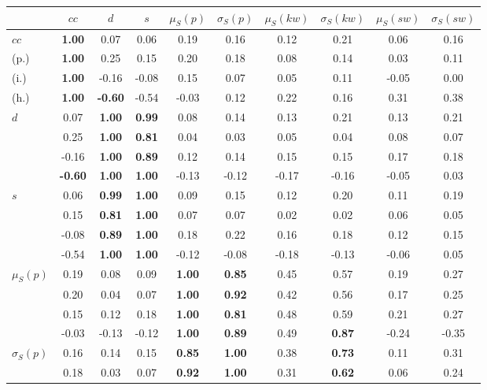 \begin{table*}[h!]
\begin{center}
\begin{tabular}{| l || c | c | c | c | c | c | c | c | c |}\hline
 & $cc$ & $d$ & $s$ & $\mu_S(p)$ & $\sigma_S(p)$ & $\mu_S(kw)$ & $\sigma_S(kw)$ & $\mu_S(sw)$ & $\sigma_S(sw)$ \\\hline\hline
$cc$ & {\bf 1.00} & 0.07 & 0.06 & 0.19 & 0.16 & 0.12 & 0.21 & 0.06 & 0.16 \\
(p.) & {\bf 1.00} & 0.25 & 0.15 & 0.20 & 0.18 & 0.08 & 0.14 & 0.03 & 0.11 \\
(i.) & {\bf 1.00} & -0.16 & -0.08 & 0.15 & 0.07 & 0.05 & 0.11 & -0.05 & 0.00 \\
(h.) & {\bf 1.00} & {\bf -0.60} & -0.54 & -0.03 & 0.12 & 0.22 & 0.16 & 0.31 & 0.38 \\\hline
$d$ & 0.07 & {\bf 1.00} & {\bf 0.99} & 0.08 & 0.14 & 0.13 & 0.21 & 0.13 & 0.21 \\
 & 0.25 & {\bf 1.00} & {\bf 0.81} & 0.04 & 0.03 & 0.05 & 0.04 & 0.08 & 0.07 \\
 & -0.16 & {\bf 1.00} & {\bf 0.89} & 0.12 & 0.14 & 0.15 & 0.15 & 0.17 & 0.18 \\
 & {\bf -0.60} & {\bf 1.00} & {\bf 1.00} & -0.13 & -0.12 & -0.17 & -0.16 & -0.05 & 0.03 \\\hline
$s$ & 0.06 & {\bf 0.99} & {\bf 1.00} & 0.09 & 0.15 & 0.12 & 0.20 & 0.11 & 0.19 \\
 & 0.15 & {\bf 0.81} & {\bf 1.00} & 0.07 & 0.07 & 0.02 & 0.02 & 0.06 & 0.05 \\
 & -0.08 & {\bf 0.89} & {\bf 1.00} & 0.18 & 0.22 & 0.16 & 0.18 & 0.12 & 0.15 \\
 & -0.54 & {\bf 1.00} & {\bf 1.00} & -0.12 & -0.08 & -0.18 & -0.13 & -0.06 & 0.05 \\\hline
$\mu_S(p)$ & 0.19 & 0.08 & 0.09 & {\bf 1.00} & {\bf 0.85} & 0.45 & 0.57 & 0.19 & 0.27 \\
 & 0.20 & 0.04 & 0.07 & {\bf 1.00} & {\bf 0.92} & 0.42 & 0.56 & 0.17 & 0.25 \\
 & 0.15 & 0.12 & 0.18 & {\bf 1.00} & {\bf 0.81} & 0.48 & 0.59 & 0.21 & 0.27 \\
 & -0.03 & -0.13 & -0.12 & {\bf 1.00} & {\bf 0.89} & 0.49 & {\bf 0.87} & -0.24 & -0.35 \\\hline
$\sigma_S(p)$ & 0.16 & 0.14 & 0.15 & {\bf 0.85} & {\bf 1.00} & 0.38 & {\bf 0.73} & 0.11 & 0.31 \\
 & 0.18 & 0.03 & 0.07 & {\bf 0.92} & {\bf 1.00} & 0.31 & {\bf 0.62} & 0.06 & 0.24 \\

\end{tabular}
\end{center}
\end{table*}
